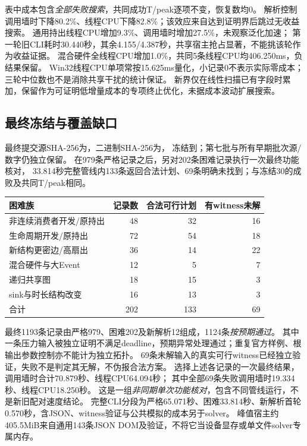 \documentclass[UTF8,a4paper,11pt,fontset=fandol]{ctexart}
\begin{document}
表中成本包含\emph{全部失败搜索}，共同成功T/peak逐项不变，恢复数均0。
解析控制调用墙时下降80.2\%、线程CPU下降82.8\%；该效应来自达到证明界后跳过无收益搜索。
通用持出线程CPU增加9.3\%、调用墙时增加27.5\%，未观察泛化加速；
第一轮旧CLI耗时30.440秒，其余4.155/\allowbreak{}4.387秒，共享宿主抢占显著，不能挑该轮作为收益证据。
混合硬件全线程CPU增加1.0\%，共同5条线程CPU均406.250ms，负结果保留。
Win32线程CPU单项常按15.625ms量化，小记录0不表示实际零成本；三轮中位数也不是消除共享干扰的统计保证。
新界仅在线性扫描已有字段时累加，保留作为可证明低增量成本的专项终止优化，未据成本波动扩展搜索。

\subsection{最终冻结与覆盖缺口}
最终提交源SHA-256为，二进制SHA-256为，
冻结到；第七批与所有早期批次源/数字仍独立保留。
在979条严格记录之后，另对202条困难记录执行一次最终功能核对，
33.814秒完整管线内133条返回合法计划、69条明确未找到；与冻结30的成败及共同T/peak相同。

\begin{center}\begin{tabular}{lrrr}
困难族 & 记录数 & 合法可行计划 & 有witness未解\\\hline
非连续消费者开发/原持出 & 48 & 32 & 16\\
生命周期开发/原持出 & 72 & 54 & 18\\
新结构更密边/高扇出 & 36 & 14 & 22\\
混合硬件与大Event & 12 & 5 & 7\\
递归共享图 & 18 & 15 & 3\\
sink与时长结构改变 & 16 & 13 & 3\\
合计 & 202 & 133 & 69\\
\end{tabular}\end{center}

最终1193条记录由严格979、困难202及新解析12组成，1124条\emph{按预期通过}。
其中一条压力输入被独立证明不满足deadline，预期异常处理通过；重复官方样例、根输出参数控制亦不能计为独立拓扑。
69条未解输入的真实可行witness已经独立验证，失败不是判定其无解，不伪报合法方案。
选择上述各记录的一次最终结果，调用墙时合计70.879秒、线程CPU64.094秒；
其中全部69条失败调用墙时19.334秒、线程CPU18.250秒。
这是一组\emph{非同期单次功能核对}，包含不同管线运行，不是新旧配对速度结论。
完整CLI分段为严格65.071秒、困难33.814秒、新解析首轮0.570秒，含JSON、witness验证与公共模拟的成本另于solver。
峰值宿主约405.5MiB来自通用143条JSON DOM及验证，不将它当设备显存或单文件solver专属内存。
\end{document}
